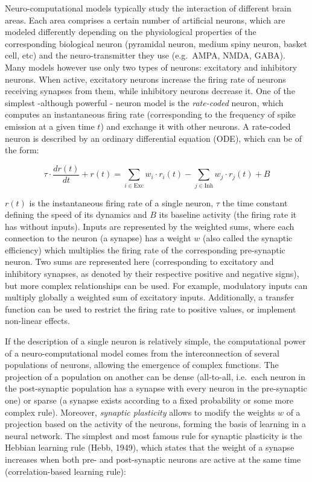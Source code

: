 \documentclass[
  11pt,
  a4paper,
]{scrbook}
\begin{document}
Neuro-computational models typically study the interaction of different
brain areas. Each area comprises a certain number of artificial neurons,
which are modeled differently depending on the physiological properties
of the corresponding biological neuron (pyramidal neuron, medium spiny
neuron, basket cell, etc) and the neuro-transmitter they use (e.g.~AMPA,
NMDA, GABA). Many models however use only two types of neurons:
excitatory and inhibitory neurons. When active, excitatory neurons
increase the firing rate of neurons receiving synapses from them, while
inhibitory neurons decrease it. One of the simplest -although powerful -
neuron model is the \emph{rate-coded} neuron, which computes an
instantaneous firing rate (corresponding to the frequency of spike
emission at a given time \(t\)) and exchange it with other neurons. A
rate-coded neuron is described by an ordinary differential equation
(ODE), which can be of the form:

\[
    \tau \cdot \frac{d r(t)}{dt} + r(t) = \sum_{i \in \text{Exc}} w_i \cdot r_i(t) - \sum_{j \in \text{Inh}} w_j \cdot r_j(t) + B
\]

\(r(t)\) is the instantaneous firing rate of a single neuron, \(\tau\)
the time constant defining the speed of its dynamics and \(B\) its
baseline activity (the firing rate it has without inputs). Inputs are
represented by the weighted sums, where each connection to the neuron (a
synapse) has a weight \(w\) (also called the synaptic efficiency) which
multiplies the firing rate of the corresponding pre-synaptic neuron. Two
sums are represented here (corresponding to excitatory and inhibitory
synapses, as denoted by their respective positive and negative signs),
but more complex relationships can be used. For example, modulatory
inputs can multiply globally a weighted sum of excitatory inputs.
Additionally, a transfer function can be used to restrict the firing
rate to positive values, or implement non-linear effects.

If the description of a single neuron is relatively simple, the
computational power of a neuro-computational model comes from the
interconnection of several populations of neurons, allowing the
emergence of complex functions. The projection of a population on
another can be dense (all-to-all, i.e.~each neuron in the post-synaptic
population has a synapse with every neuron in the pre-synaptic one) or
sparse (a synapse exists according to a fixed probability or some more
complex rule). Moreover, \emph{synaptic plasticity} allows to modify the
weights \(w\) of a projection based on the activity of the neurons,
forming the basis of learning in a neural network. The simplest and most
famous rule for synaptic plasticity is the Hebbian learning rule (Hebb,
1949), which states that the weight of a synapse increases when both
pre- and post-synaptic neurons are active at the same time
(correlation-based learning rule):
\end{document}
